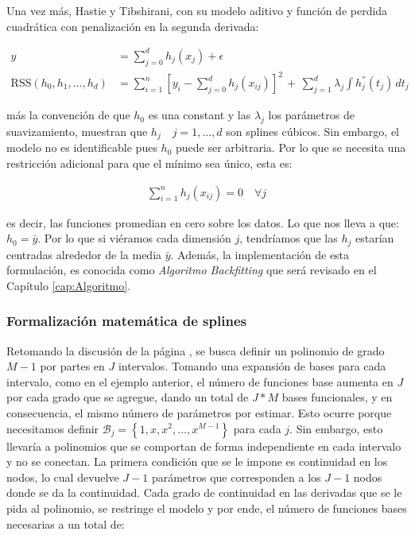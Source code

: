 \documentclass[../Main/Main.tex]{subfiles}
\begin{document}
Una vez más, Hastie y Tibshirani, con su modelo aditivo y función de perdida cuadrática con penalización en la segunda derivada:

\begin{align*}
	y &= \sum_{j = 0}^d h_j(x_j) + \epsilon \\	
	\text{RSS}(h_0, h_1, \ldots, h_d) &= \sum_{i = 1}^n[y_i - \sum_{j = 0}^d h_j(x_{ij})]^2 \, + \, \sum_{j = 1}^d\lambda_j 			\int h_j^{''}(t_j) \, dt_j
\end{align*}

más la convención de que $h_0$ es una constant y las $\lambda_j$ los parámetros de suavizamiento, muestran que $h_j \quad j = 1,\ldots,d$ son splines cúbicos. Sin embargo, el modelo no es identificable pues $h_0$ puede ser arbitraria. Por lo que se necesita una restricción adicional para que el mínimo sea único, esta es:

\begin{align}
	\sum_{i = 1}^n h_j(x_{ij}) = 0 \quad \forall j \label{ec:RestriccionGAM}
\end{align}

es decir, las funciones promedian en cero sobre los datos. Lo que nos lleva a que: $h_0 = \bar{y}$. Por lo que si viéramos cada dimensión $j$, tendríamos que las $h_j$ estarían centradas alrededor de la media $\bar{y}$. Además, la implementación de esta formulación, es conocida como \textit{Algoritmo Backfitting} que será revisado en el Capítulo \ref{cap:Algoritmo}. \\

\subsubsection{Formalización matemática de splines}

Retomando la discusión de la página \pageref{sec:PolisYSplines}, se busca definir un polinomio de grado $M-1$ por partes en $J$ intervalos. Tomando una expansión de bases para cada intervalo, como en el ejemplo anterior, el número de funciones base aumenta en $J$ por cada grado que se agregue, dando un total de $J*M$ bases funcionales, y en consecuencia, el mismo número de parámetros por estimar. Esto ocurre porque necesitamos definir $\mathcal{B}_j = \left\{1,x,x^2,\ldots,x^{M-1}\right\}$ para cada $j$. Sin embargo, esto llevaría a polinomios que se comportan de forma independiente en cada intervalo y no se conectan. La primera condición que se le impone es continuidad en los nodos, lo cual  devuelve $J-1$ parámetros que corresponden a los $J-1$ nodos donde se da la continuidad. Cada grado de continuidad en las derivadas que se le pida al polinomio, se restringe el modelo y por ende, el número de funciones bases necesarias a un total de:
\end{document}

